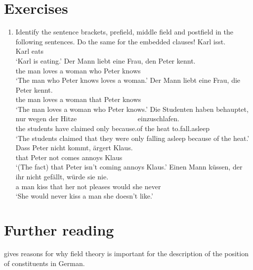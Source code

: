 \section*{Exercises}

\begin{enumerate}
\item Identify the sentence brackets, prefield, middle field and postfield in the following sentences. Do the same for the embedded clauses! 
\eal
\ex 
\gll Karl isst.\\
	 Karl eats\\
\glt `Karl is eating.'
\ex 
\gll Der Mann liebt eine Frau, den Peter kennt.\\
     the man  loves a woman who Peter knows\\
\glt `The man who Peter knows loves a woman.'
\ex 
\gll Der Mann liebt eine Frau, die Peter kennt.\\
	 the man loves a woman that Peter knows\\
\glt `The man loves a woman who Peter knows.'
\ex 
\gll Die Studenten haben behauptet, nur wegen der Hitze~~~~~~~~~~~~~~~~~ einzuschlafen.\\
	 the students have claimed only because.of the heat to.fall.asleep\\
\glt `The students claimed that they were only falling asleep because of the heat.'
\ex 
\gll Dass Peter nicht kommt, ärgert Klaus.\\
	 that Peter not comes annoys Klaus\\
\glt `(The fact) that Peter isn't coming annoys Klaus.'
\ex 
\gll Einen Mann küssen, der ihr nicht gefällt, würde sie nie.\\
	 a man kiss that her not pleases would she never\\
\glt `She would never kiss a man she doesn't like.'
\zl
\end{enumerate}


\section*{Further reading}

\citet{Reis80a} gives reasons for why field theory is important for the description of the position of constituents in German.


